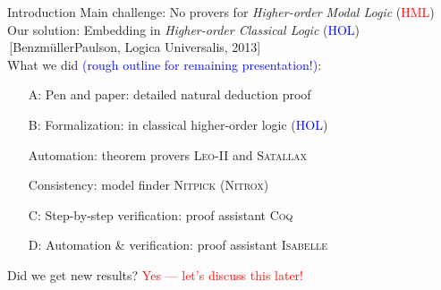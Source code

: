 \begin{frame}{Introduction} \large
Main challenge: \hfill No provers for \emph{Higher-order Modal Logic\/} (\textcolor{red}{HML}) \\[1em]

Our solution: \hfill Embedding in \emph{Higher-order Classical Logic\/} (\textcolor{blue}{HOL}) \\
\,\hfill {\small [Benzm\"ullerPaulson, Logica Universalis, 2013]} \\[2em]

What we did \textcolor{blue}{(rough outline for remaining
  presentation!)}: \\

\begin{itemize}
\item[A:] Pen and paper: \hfill detailed natural deduction proof 
\item[B:] Formalization: \hfill in classical higher-order logic (\textcolor{blue}{HOL})
\item[] Automation: \hfill theorem provers \textsc{Leo-II} and \textsc{Satallax} 
\item[] Consistency: \hfill model finder \textsc{Nitpick (Nitrox)} 
\item[C:] Step-by-step verification: \hfill proof assistant \textsc{Coq} 
\item[D:] Automation \& verification: \hfill proof assistant \textsc{Isabelle} \\[2em]
\end{itemize}
Did we get new results? \hfill  \textcolor{red}{Yes --- let's discuss this later!}
\end{frame}
